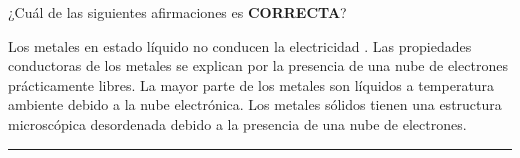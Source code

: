 \documentclass[answers,addpoints,14pt]{exam}
\newcommand*\chem[1]{\ensuremath{\mathrm{#1}}}
\newcommand{\halmos}{\vspace*{-4mm}
	
					\begin{flushright}
						\rule{1mm}{2.5mm} 
					\end{flushright}\vspace*{-4mm}
						
					  }
\renewcommand{\qed}{\halmos}
\begin{document}
	\begin{questions}
	
%			
		
	
	\begin{question}[1] ¿Cuál de las siguientes afirmaciones es \textbf{\small{CORRECTA}}?
		\begin{checkboxes}
			\choice  Los metales en estado líquido no conducen la electricidad	.
			\CorrectChoice Las propiedades conductoras de los metales se explican por la presencia de una nube de electrones prácticamente libres.
			\choice La mayor parte de los metales son líquidos a temperatura ambiente debido a la nube electrónica.
			\choice Los metales sólidos tienen una estructura microscópica desordenada debido a la presencia de una nube de electrones.
		\end{checkboxes}
	\end{question}
	\qed
	\vspace{-2ex}
	
		

	
%		
	

\end{questions}
\end{document}
